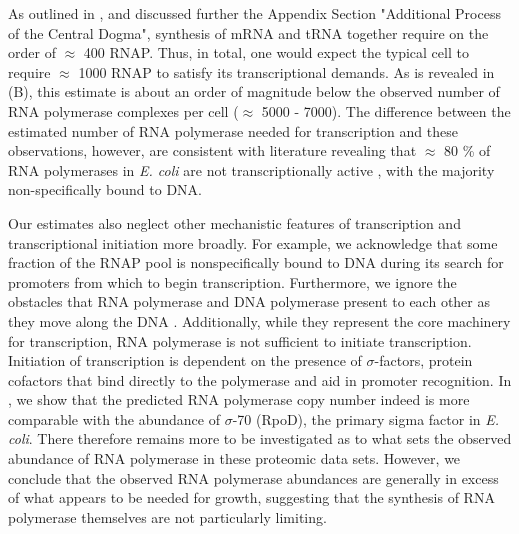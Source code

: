 As outlined in , and discussed further the Appendix
Section "Additional Process of the Central Dogma", synthesis of mRNA and tRNA together require
on the order of $\approx$ 400 RNAP. Thus, in total, one would expect the
typical cell to require $\approx$ 1000 RNAP to satisfy its transcriptional
demands. As is revealed in (B), this estimate is about an
order of magnitude below the observed number of RNA polymerase complexes per
cell ($\approx$ 5000 - 7000). The difference between the estimated number of
RNA polymerase needed for transcription and these observations, however, are
consistent with literature revealing that $\approx$ 80 \% of RNA
polymerases in \textit{E. coli} are not transcriptionally active
\citep{klumpp2008, patrick2015}, with the majority non-specifically bound to
DNA.

Our estimates also neglect other mechanistic features of transcription and
transcriptional initiation more broadly. For example, we acknowledge that
some fraction of the RNAP pool is nonspecifically bound to DNA during its
search for promoters from which to begin transcription. Furthermore, we
ignore the obstacles that RNA polymerase and DNA polymerase present to each
other as they move along the DNA \citep{finkelstein2013}. Additionally, while
they represent the core machinery for transcription, RNA polymerase is not
sufficient to initiate transcription. Initiation of transcription is
dependent on the presence of $\sigma$-factors, protein cofactors that bind
directly to the polymerase \citep{browning2016} and aid in promoter
recognition. In , we show that the predicted
RNA polymerase copy number indeed is more comparable with the abundance of
$\sigma$-70 (RpoD), the primary sigma factor in \textit{E. coli}. There
therefore remains more to be investigated as to what sets the observed
abundance of RNA polymerase in these proteomic data sets. However, we
conclude that the observed RNA polymerase abundances are generally in excess
of what appears to be needed for growth, suggesting that the synthesis of RNA
polymerase themselves are not particularly limiting.

